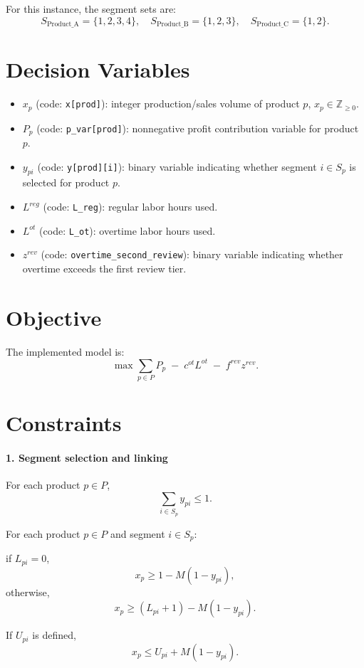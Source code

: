 For this instance, the segment sets are:
\[
S_{\text{Product\_A}}=\{1,2,3,4\},\quad
S_{\text{Product\_B}}=\{1,2,3\},\quad
S_{\text{Product\_C}}=\{1,2\}.
\]

\section*{Decision Variables}

\begin{itemize}
    \item $x_p$ (code: \texttt{x[prod]}): integer production/sales volume of product $p$, $x_p \in \mathbb{Z}_{\ge 0}$.
    \item $P_p$ (code: \texttt{p\_var[prod]}): nonnegative profit contribution variable for product $p$.
    \item $y_{pi}$ (code: \texttt{y[prod][i]}): binary variable indicating whether segment $i \in S_p$ is selected for product $p$.
    \item $L^{reg}$ (code: \texttt{L\_reg}): regular labor hours used.
    \item $L^{ot}$ (code: \texttt{L\_ot}): overtime labor hours used.
    \item $z^{rev}$ (code: \texttt{overtime\_second\_review}): binary variable indicating whether overtime exceeds the first review tier.
\end{itemize}

\section*{Objective}

The implemented model is:
\[
\max \sum_{p \in P} P_p \;-\; c^{ot} L^{ot} \;-\; f^{rev} z^{rev}.
\]

\section*{Constraints}

\paragraph{1. Segment selection and linking}
For each product $p \in P$,
\[
\sum_{i \in S_p} y_{pi} \le 1.
\]

For each product $p \in P$ and segment $i \in S_p$:

if $L_{pi}=0$,
\[
x_p \ge 1 - M(1-y_{pi}),
\]
otherwise,
\[
x_p \ge (L_{pi}+1) - M(1-y_{pi}).
\]

If $U_{pi}$ is defined,
\[
x_p \le U_{pi} + M(1-y_{pi}).
\]

